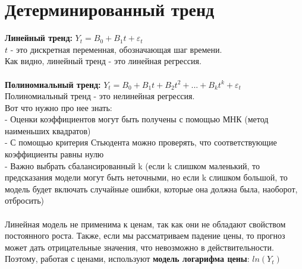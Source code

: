 \documentclass{article}
\begin{document}
\section{Детерминированный тренд}
\begin{itemize}
    \textbf{Линейный тренд:} $Y_t = B_0 + B_1t + \varepsilon_t$
    \\$t$ - это дискретная переменная, обозначающая шаг времени.
    \\ Как видно, линейный тренд - это линейная регрессия.
    \\
    \\ \textbf{Полиномиальный тренд:} $Y_t = B_0 + B_1t + B_2t^2 + ... + B_kt^k + \varepsilon_t$
    \\Полиномиальный тренд - это нелинейная регрессия. 
    \\ Вот что нужно про нее знать:
    \\ - Оценки коэффициентов могут быть получены с помощью МНК (метод наименьших квадратов) 
    \\ - С помощью критерия Стьюдента можно проверять, что соответствующие коэффициенты равны нулю
    \\ - Важно выбрать сбалансированный k (если k слишком маленький, то предсказания модели могут быть неточными, но если k слишком большой, то модель будет включать случайные ошибки, которые она должна была, наоборот, отбросить)
    \\
    \\
    Линейная модель не применима к ценам, так как они не обладают свойством постоянного роста. Также, если мы рассматриваем падение цены, то прогноз может дать отрицательные значения, что невозможно в действительности. 
    \\ Поэтому, работая с ценами, используют \textbf{модель логарифма цены}: $ln(Y_t)$
\end{itemize}
\end{document}
